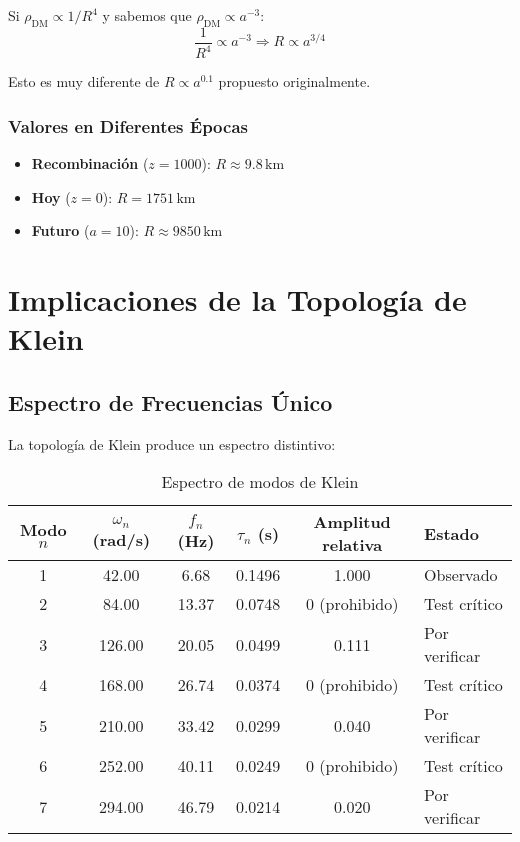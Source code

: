 \documentclass[12pt,a4paper]{article}
\begin{document}
Si $\rho_\mathrm{DM} \propto 1/R^4$ y sabemos que $\rho_\mathrm{DM} \propto a^{-3}$:
\begin{equation}
\frac{1}{R^4} \propto a^{-3} \Rightarrow R \propto a^{3/4}
\end{equation}

Esto es muy diferente de $R \propto a^{0.1}$ propuesto originalmente.

\subsubsection{Valores en Diferentes Épocas}

\begin{itemize}
    \item \textbf{Recombinación} ($z=1000$): $R \approx 9.8\,\mathrm{km}$
    \item \textbf{Hoy} ($z=0$): $R = 1751\,\mathrm{km}$
    \item \textbf{Futuro} ($a=10$): $R \approx 9850\,\mathrm{km}$
\end{itemize}

\section{Implicaciones de la Topología de Klein}
\label{sec:klein}

\subsection{Espectro de Frecuencias Único}

La topología de Klein produce un espectro distintivo:

\begin{table}[H]
\centering
\caption{Espectro de modos de Klein}
\label{tab:espectro}
\begin{tabular}{cccccl}
\toprule
Modo $n$ & $\omega_n$ (rad/s) & $f_n$ (Hz) & $\tau_n$ (s) & Amplitud relativa & Estado \\
\midrule
1 & 42.00 & 6.68 & 0.1496 & 1.000 & Observado \\
2 & 84.00 & 13.37 & 0.0748 & 0 (prohibido) & Test crítico \\
3 & 126.00 & 20.05 & 0.0499 & 0.111 & Por verificar \\
4 & 168.00 & 26.74 & 0.0374 & 0 (prohibido) & Test crítico \\
5 & 210.00 & 33.42 & 0.0299 & 0.040 & Por verificar \\
6 & 252.00 & 40.11 & 0.0249 & 0 (prohibido) & Test crítico \\
7 & 294.00 & 46.79 & 0.0214 & 0.020 & Por verificar \\
\bottomrule
\end{tabular}
\end{table}
\end{document}
